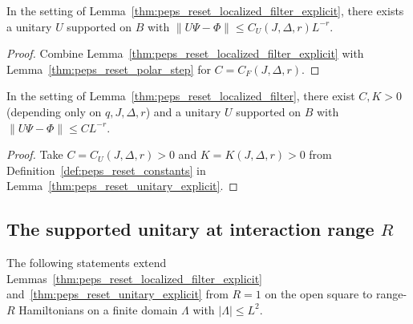 \begin{lemma}
    \label{thm:peps_reset_unitary_explicit}
    \leanok
    In the setting of Lemma~\ref{thm:peps_reset_localized_filter_explicit}, there exists a unitary $U$ supported on $B$ with $\|U\Psi-\Phi\|\le C_U(J,\Delta,r)L^{-r}$.
\end{lemma}
\begin{proof}
    \leanok
    Combine Lemma~\ref{thm:peps_reset_localized_filter_explicit} with Lemma~\ref{thm:peps_reset_polar_step} for $C=C_F(J,\Delta,r)$.
\end{proof}

\begin{lemma}
    \label{thm:peps_reset_unitary}
    \leanok
    In the setting of Lemma~\ref{thm:peps_reset_localized_filter}, there exist $C,K>0$ (depending only on $q,J,\Delta,r$) and a unitary $U$ supported on $B$ with $\|U\Psi-\Phi\|\le CL^{-r}$.
\end{lemma}
\begin{proof}
    \leanok
    Take $C=C_U(J,\Delta,r)>0$ and $K=K(J,\Delta,r)>0$ from Definition~\ref{def:peps_reset_constants} in Lemma~\ref{thm:peps_reset_unitary_explicit}.
\end{proof}

\subsection{The supported unitary at interaction range $R$}

The following statements extend Lemmas~\ref{thm:peps_reset_localized_filter_explicit} and~\ref{thm:peps_reset_unitary_explicit} from $R=1$ on the open square to range-$R$ Hamiltonians on a finite domain $\Lambda$ with $|\Lambda|\le L^2$.

